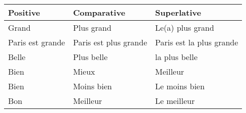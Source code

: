 \vspace{0.5cm}
\begin{tabular}{l | l | l}
Positive  & Comparative & Superlative \\ \hline
Grand     & Plus grand  & Le(a) plus grand \\
Paris est grande & Paris est plus grande & Paris est la plus grande \\
Belle     & Plus belle  & la plus belle \\
Bien      & Mieux       & Meilleur  \\
Bien      & Moins bien  & Le moins bien \\
Bon       & Meilleur    & Le meilleur \\
\end{tabular}



